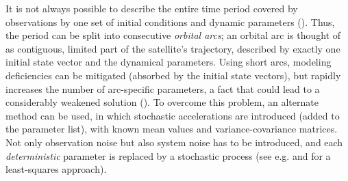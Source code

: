 It is not always possible to describe the entire time period covered by observations 
by one set of initial conditions and dynamic parameters (\cite{BeutlerVII}). Thus,
the period can be split into consecutive \emph{orbital arcs}; an orbital arc is 
thought of as contiguous, limited part of the satellite's trajectory, described by 
exactly one initial state vector and the dynamical parameters. Using short arcs, 
modeling deficiencies can be mitigated (absorbed by the initial state vectors),
but rapidly increases the number of arc-speciﬁc parameters, a fact that could lead 
to a considerably weakened solution (\cite{BeutlerVII}). To overcome this problem, 
an alternate method can be used, in which stochastic accelerations are introduced 
(added to the parameter list), with known mean values and variance-covariance matrices.
Not only observation noise but also system noise has to be introduced, and each 
\emph{deterministic} parameter is replaced by a stochastic process (see e.g. \cite{Jaggi2005b} 
and \cite{Jaggi2005a} for a least-squares approach).
